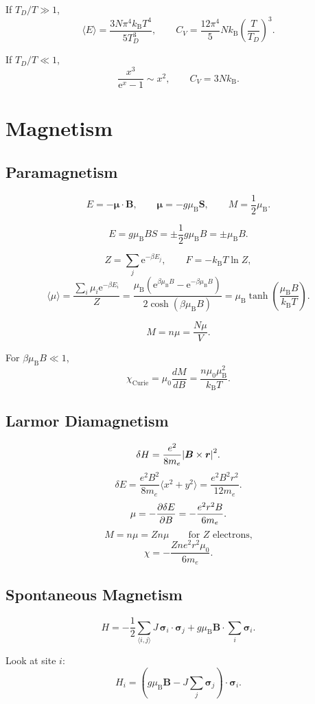 \documentclass[11pt,a4paper]{article}
\newcommand{\ee}{\mathrm{e}}
\newcommand{\kB}{k_{\mathrm B}}
\newcommand{\muB}{\mu_{\mathrm B}}
\newcommand{\vect}[1]{\boldsymbol{#1}}
\begin{document}
If $T_D/T\gg 1$,
\[
  \langle E\rangle
  =
  \frac{3N\pi^4\kB T^4}{5T_D^3},
  \qquad
  C_V=\frac{12\pi^4}{5}N\kB\left(\frac{T}{T_D}\right)^3.
\]

If $T_D/T\ll 1$,
\[
  \frac{x^3}{\ee^x-1}\sim x^2,
  \qquad
  C_V=3N\kB.
\]

\section{Magnetism}

\subsection{Paramagnetism}

\[
  E=-\vect\mu\cdot\vect B,
  \qquad
  \vect\mu=-g\muB\vect S,
  \qquad
  M=\frac12\muB.
\]

\[
  E=g\muB B S
  =
  \pm\frac12g\muB B
  =
  \pm\muB B.
\]

\[
  Z=\sum_j\ee^{-\beta E_j},
  \qquad
  F=-\kB T\ln Z,
\]
\[
  \langle\mu\rangle
  =
  \frac{\sum_i\mu_i\ee^{-\beta E_i}}{Z}
  =
  \frac{\muB\left(\ee^{\beta\muB B}-\ee^{-\beta\muB B}\right)}
  {2\cosh(\beta\muB B)}
  =
  \muB\tanh\left(\frac{\muB B}{\kB T}\right).
\]

\[
  M=n\mu=\frac{N\mu}{V}.
\]

For $\beta\muB B\ll 1$,
\[
  \chi_{\mathrm{Curie}}
  =
  \mu_0\frac{dM}{dB}
  =
  \frac{n\mu_0\muB^2}{\kB T}.
\]

\subsection{Larmor Diamagnetism}

\[
  \delta H
  =
  \frac{e^2}{8m_e}\abs{\vect B\times\vect r}^{2}.
\]
\[
  \delta E
  =
  \frac{e^2B^2}{8m_e}\langle x^2+y^2\rangle
  =
  \frac{e^2B^2r^2}{12m_e}.
\]
\[
  \mu=-\pdv{\delta E}{B}
  =
  -\frac{e^2r^2B}{6m_e}.
\]
\[
  M=n\mu=Zn\mu
  \qquad \text{for $Z$ electrons,}
\]
\[
  \chi
  =
  -\frac{Zn e^2 r^2\mu_0}{6m_e}.
\]

\subsection{Spontaneous Magnetism}

\[
  H
  =
  -\frac12\sum_{\langle i,j\rangle}J\,\vect\sigma_i\cdot\vect\sigma_j
  +
  g\muB\vect B\cdot\sum_i\vect\sigma_i.
\]

Look at site $i$:
\[
  H_i
  =
  \left(g\muB\vect B-J\sum_j\vect\sigma_j\right)\cdot\vect\sigma_i.
\]
\end{document}
